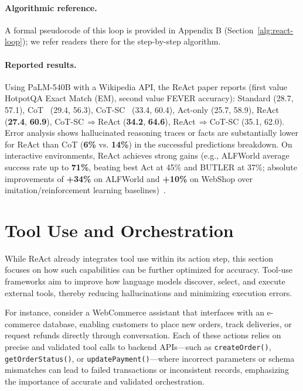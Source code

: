 \paragraph{Algorithmic reference.} A formal pseudocode of this loop is provided in Appendix B (Section~\ref{alg:react-loop}); we refer readers there for the step-by-step algorithm.

\paragraph{Reported results.} Using PaLM-540B with a Wikipedia API, the ReAct paper reports (first value HotpotQA Exact Match (EM), second value FEVER accuracy): Standard (28.7, 57.1), CoT~\cite{chainofthought} (29.4, 56.3), CoT-SC~\cite{chainofthought} (33.4, 60.4), Act-only (25.7, 58.9), ReAct (\textbf{27.4}, \textbf{60.9}), CoT-SC$\,\Rightarrow$ReAct (\textbf{34.2}, \textbf{64.6}), ReAct$\,\Rightarrow$CoT-SC (35.1, 62.0). Error analysis shows hallucinated reasoning traces or facts are substantially lower for ReAct than CoT (\textbf{6\%} vs. \textbf{14\%}) in the successful predictions breakdown. On interactive environments, ReAct achieves strong gains (e.g., ALFWorld average success rate up to \textbf{71\%}, beating best Act at 45\% and BUTLER at 37\%; absolute improvements of \textbf{+34\%} on ALFWorld and \textbf{+10\%} on WebShop over imitation/reinforcement learning baselines)~\cite{react}.


\section{Tool Use and Orchestration}

While ReAct already integrates tool use within its action step, this section focuses on how such capabilities can be further optimized for accuracy.  
Tool-use frameworks aim to improve how language models discover, select, and execute external tools, thereby reducing hallucinations and minimizing execution errors.  

For instance, consider a WebCommerce assistant that interfaces with an e-commerce database, enabling customers to place new orders, track deliveries, or request refunds directly through conversation.
Each of these actions relies on precise and validated tool calls to backend APIs—such as \texttt{createOrder()}, \texttt{getOrderStatus()}, or \texttt{updatePayment()}—where incorrect parameters or schema mismatches can lead to failed transactions or inconsistent records, emphasizing the importance of accurate and validated orchestration. 

